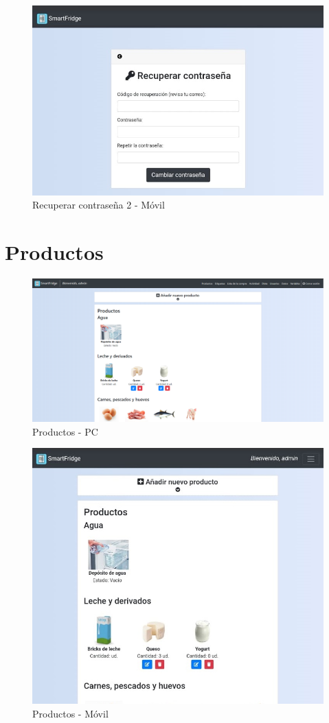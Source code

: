 \begin{figure}[h] 
    \centering
    \includegraphics[width=.50\textwidth]{capitulos/anexotres/Phone/Recover.jpeg}
    \caption{Recuperar contraseña 2 - Móvil}
    \label{fig:recoverphone}
\end{figure}

\newpage
\section{Productos}
\begin{figure}[h] 
    \centering
    \includegraphics[width=.90\textwidth]{capitulos/anexotres/PC/Products.png}
    \caption{Productos - PC}
    \label{fig:productspc}
\end{figure}

\begin{figure}[h] 
    \centering
    \includegraphics[width=.50\textwidth]{capitulos/anexotres/Phone/Products.jpeg}
    \caption{Productos - Móvil}
    \label{fig:productsphone}
\end{figure}

